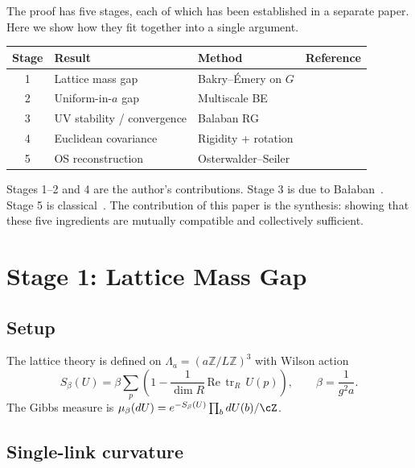 \documentclass[11pt,a4paper]{article}
\theoremstyle{plain}
\theoremstyle{definition}
\theoremstyle{remark}
\newcommand{\Z}{\mathbb{Z}}
\newcommand{\tr}{\operatorname{tr}}
\begin{document}
The proof has five stages, each of which has been
established in a separate paper. Here we show how they
fit together into a single argument.

\medskip
\begin{center}
\renewcommand{\arraystretch}{1.4}
\begin{tabular}{@{}clll@{}}
\toprule
\textbf{Stage} & \textbf{Result} & \textbf{Method}
  & \textbf{Reference} \\
\midrule
1 & Lattice mass gap & Bakry--\'Emery on $G$
  & \cite{FontesLattice} \\
2 & Uniform-in-$a$ gap & Multiscale BE
  & \cite{FontesUniform} \\
3 & UV stability / convergence & Balaban RG
  & \cite{Bal85e} \\
4 & Euclidean covariance & Rigidity + rotation
  & \cite{FontesEuclidean} \\
5 & OS reconstruction & Osterwalder--Seiler
  & \cite{OS78} \\
\bottomrule
\end{tabular}
\end{center}

\medskip\noindent
Stages 1--2 and 4 are the author's contributions.
Stage 3 is due to Ba{\l}aban~\cite{Bal85e}.
Stage 5 is classical~\cite{OS78,GJ87}.
The contribution of this paper is the synthesis:
showing that these five ingredients are mutually
compatible and collectively sufficient.

\section{Stage 1: Lattice Mass Gap}\label{sec:lattice}

\subsection{Setup}

The lattice theory is defined on $\Lambda_a = (a\Z/L\Z)^3$
with Wilson action
\begin{equation}\label{eq:wilson}
  S_\beta(U) = \beta \sum_p
  \left(1 - \frac{1}{\dim R}\,\text{Re}\,\tr_R\, U(p)\right),
  \qquad \beta = \frac{1}{g^2 a}.
\end{equation}
The Gibbs measure is $\mu_\beta(dU) = e^{-S_\beta(U)}
\prod_b dU(b) / \cZ$.

\subsection{Single-link curvature}
\end{document}
